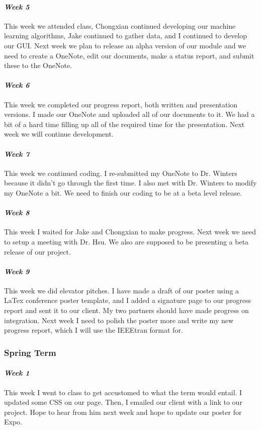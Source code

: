 \documentclass[onecolumn, draftclsnofoot,10pt, compsoc]{IEEEtran}
\begin{document}
\paragraph{\emph{Week 5}}
This week we attended class, Chongxian continued developing our machine learning algorithms, Jake continued to gather data, and I continued to develop our GUI. Next week we plan to release an alpha version of our module and we need to create a OneNote, edit our documents, make a status report, and submit these to the OneNote.
\paragraph{\emph{Week 6}}
This week we completed our progress report, both written and presentation versions. I made our OneNote and uploaded all of our documents to it. We had a bit of a hard time filling up all of the required time for the presentation. Next week we will continue development.
\paragraph{\emph{Week 7}}
This week we continued coding. I re-submitted my OneNote to Dr. Winters because it didn't go through the first time. I also met with Dr. Winters to modify my OneNote a bit. We need to finish our coding to be at a beta level release.
\paragraph{\emph{Week 8}}
This week I waited for Jake and Chongxian to make progress. Next week we need to setup a meeting with Dr. Hsu. We also are supposed to be presenting a beta release of our project.
\paragraph{\emph{Week 9}}
This week we did elevator pitches. I have made a draft of our poster using a LaTex conference poster template, and I added a signature page to our progress report and sent it to our client. My two partners should have made progress on integration. Next week I need to polish the poster more and write my new progress report, which I will use the IEEEtran format for.
\subsubsection{Spring Term}
\paragraph{\emph{Week 1}}
This week I went to class to get accustomed to what the term would entail. I updated some CSS on our page. Then, I emailed our client with a link to our project. Hope to hear from him next week and hope to update our poster for Expo.
\end{document}
